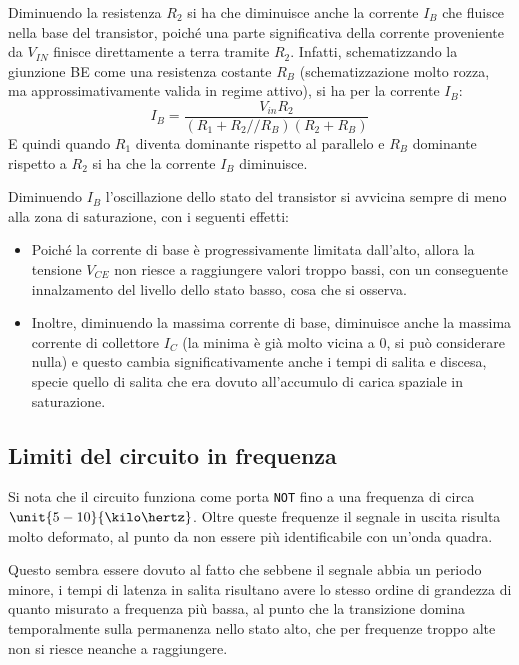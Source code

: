 \documentclass[10pt,a4paper]{article}
\def\code#1{\texttt{#1}}
\begin{document}
Diminuendo la resistenza $R_2$ si ha che diminuisce anche la corrente $I_B$ che fluisce nella base del transistor, poiché una parte significativa della corrente proveniente da $V_{IN}$ finisce direttamente a terra tramite $R_2$. Infatti, schematizzando la giunzione BE come una resistenza costante $R_B$ (schematizzazione molto rozza, ma approssimativamente valida in regime attivo), si ha per la corrente $I_B$:
\begin{equation*}
I_B = \frac{V_{in} R_2}{(R_1 + R_2 // R_B)(R_2 + R_B)}
\end{equation*}
E quindi quando $R_1$ diventa dominante rispetto al parallelo e $R_B$ dominante rispetto a $R_2$ si ha che la corrente $I_B$ diminuisce.

Diminuendo $I_B$ l'oscillazione dello stato del transistor si avvicina sempre di meno alla zona di saturazione, con i seguenti effetti:
\begin{itemize}
\item Poiché la corrente di base è progressivamente limitata dall'alto, allora la tensione $V_{CE}$ non riesce a raggiungere valori troppo bassi, con un conseguente innalzamento del livello dello stato basso, cosa che si osserva.
\item Inoltre, diminuendo la massima corrente di base, diminuisce anche la massima corrente di collettore $I_C$ (la minima è già molto vicina a 0, si può considerare nulla) e questo cambia significativamente anche i tempi di salita e discesa, specie quello di salita che era dovuto all'accumulo di carica spaziale in saturazione.
\end{itemize}

\subsection{Limiti del circuito in frequenza}
Si nota che il circuito funziona come porta \code{NOT} fino a una frequenza di circa $\unit{5-10}{\kilo\hertz}$. Oltre queste frequenze il segnale in uscita risulta molto deformato, al punto da non essere più identificabile con un'onda quadra.

Questo sembra essere dovuto al fatto che sebbene il segnale abbia un periodo minore, i tempi di latenza in salita risultano avere lo stesso ordine di grandezza di quanto misurato a frequenza più bassa, al punto che la transizione domina temporalmente sulla permanenza nello stato alto, che per frequenze troppo alte non si riesce neanche a raggiungere.
\end{document}
